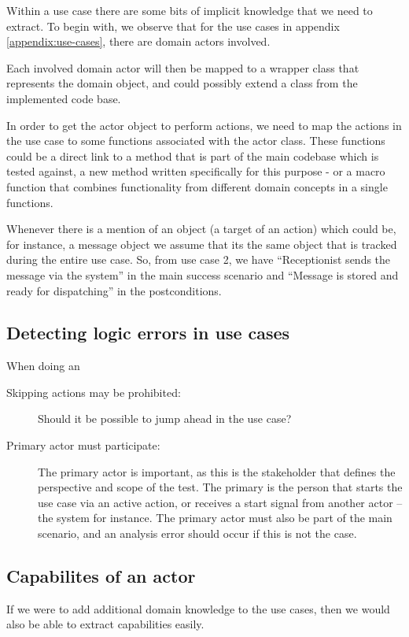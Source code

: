 Within a use case there are some bits of implicit knowledge that we need to extract. To begin with, we observe that for the use cases in appendix \ref{appendix:use-cases}, there are domain actors involved.

Each involved domain actor will then be mapped to a wrapper class that represents the domain object, and could possibly extend a class from the implemented code base.

In order to get the actor object to perform actions, we need to map the actions in the use case to some functions associated with the actor class. These functions could be a direct link to a method that is part of the main codebase which is tested against, a new method written specifically for this purpose - or a macro function that combines functionality from different domain concepts in a single functions.

Whenever there is a mention of an object (a target of an action) which could be, for instance, a message object we assume that its the same object that is tracked during the entire use case. So, from use case 2, we have ``Receptionist sends the message via the system'' in the main success scenario and ``Message is stored and ready for dispatching'' in the postconditions.

\subsection{Detecting logic errors in use cases}
When doing an
\begin{description}
  \item[Skipping actions may be prohibited:] Should it be possible to jump ahead in the use case?
  \item[Primary actor must participate:] The primary actor is important, as this is the stakeholder that defines the perspective and scope of the test. The primary is the person that starts the use case via an active action, or receives a start signal from another actor -- the system for instance. The primary actor must also be part of the main scenario, and an analysis error should occur if this is not the case.

\end{description}
\subsection{Capabilites of an actor}
If we were to add additional domain knowledge to the use cases, then we would also be able to extract capabilities easily.
